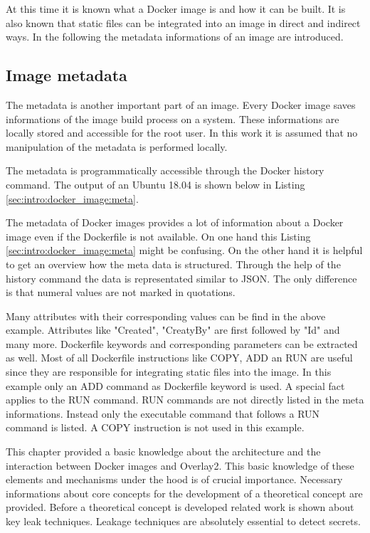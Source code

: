 At this time it is known what a Docker image is and how it can be built. 
It is also known that static files can be integrated into an image in direct and indirect ways. 
In the following the metadata informations of an image are introduced.

\subsection{Image metadata}
\label{sec:intro:docker_image:docker_img:meta}
The metadata is another important part of an image. 
Every Docker image saves informations of the image build process on a system.  
These informations are locally stored and accessible for the root user. 
In this work it is assumed that no manipulation of the metadata is performed locally. 

The metadata is programmatically accessible through the Docker history command. The output of an Ubuntu 18.04 is shown below in Listing \ref{sec:intro:docker_image:meta}.

The metadata of Docker images provides a lot of information about a Docker image even if the Dockerfile is not available. On one hand this Listing \ref{sec:intro:docker_image:meta} might be confusing. On the other hand it is helpful to get an overview how the meta data is structured. 
Through the help of the history command the data is representated similar to JSON. The only difference is that numeral values are not marked in quotations. 

Many attributes with their corresponding values can be find in the above example. Attributes like "Created", "CreatyBy" are first followed by "Id" and many more. 	
Dockerfile keywords and corresponding parameters can be extracted as well.
Most of all Dockerfile instructions like COPY, ADD an RUN are useful since they are responsible for integrating static files into the image.
In this example only an ADD command as Dockerfile keyword is used.
A special fact applies to the RUN command. RUN commands are not directly listed in the meta informations.
Instead only the executable command that follows a RUN command is listed.
A COPY instruction is not used in this example.

This chapter provided a basic knowledge about the architecture and the interaction between Docker images and Overlay2. 
This basic knowledge of these elements and mechanisms under the hood is of crucial importance. 
Necessary informations about core concepts for the development of a theoretical concept are provided.
Before a theoretical concept is developed related work is shown about key leak techniques.
Leakage techniques are absolutely essential to detect secrets.